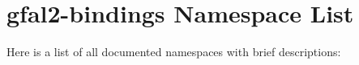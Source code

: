 \section{gfal2-bindings Namespace List}
Here is a list of all documented namespaces with brief descriptions:\begin{CompactList}
\item{}
\end{CompactList}
